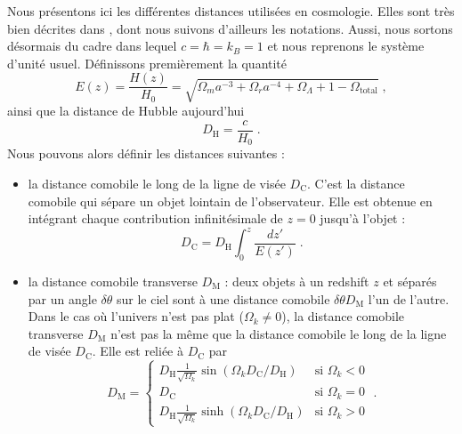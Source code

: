 Nous présentons ici les différentes distances utilisées en cosmologie. Elles sont très bien décrites dans \textcite{Hogg1999}, dont nous suivons d'ailleurs les notations. Aussi, nous sortons désormais du cadre dans lequel $c = \hbar = k_{B} = 1$ et nous reprenons le système d'unité usuel. Définissons premièrement la quantité
\begin{equation}
  \label{eq:dist_ez}
  E(z) = \frac{H(z)}{H_0} 
  = \sqrt{\Omega_m a^{-3} + \Omega_r a^{-4} + \Omega_{\Lambda} + 1 - \Omega_{\mathrm{total}}}  \; ,
\end{equation}
ainsi que la distance de Hubble aujourd'hui
\begin{equation}
  \label{eq:dist_hubble}
  D_{\mathrm{H}} = \frac{c}{H_0}  \; .
\end{equation}
Nous pouvons alors définir les distances suivantes :
\begin{itemize}[label=$\bullet$]
\item la distance comobile le long de la ligne de visée $D_{\mathrm{C}}$. C'est la distance comobile qui sépare un objet lointain de l'observateur. Elle est obtenue en intégrant chaque contribution infinitésimale de $z=0$ jusqu'à l'objet :
  \begin{equation}
    \label{eq:dist_como}
    D_{\mathrm{C}} = D_{\mathrm{H}} \int_0^z \frac{dz'}{E(z')}  \; .
  \end{equation}
\item la distance comobile transverse $D_{\mathrm{M}}$ : deux objets à un redshift $z$ et séparés par un angle $\delta \theta$ sur le ciel sont à une distance comobile $\delta \theta D_{\mathrm{M}}$ l'un de l'autre.
  Dans le cas où l'univers n'est pas plat ($\Omega_k \neq 0$), la distance comobile transverse $D_{\mathrm{M}}$  n'est pas la même que la distance comobile le long de la ligne de visée $D_{\mathrm{C}}$. Elle est reliée à $D_{\mathrm{C}}$ par
  \begin{equation}
    \label{eq:dist_como_trans}
    D_{\mathrm{M}} = \left\{
      \begin{array}{ll}
        D_{\mathrm{H}} \frac{1}{\sqrt{\Omega_k}} \sin(\Omega_k D_{\mathrm{C}} / D_{\mathrm{H}}) & \mbox{si } \Omega_k < 0 \\
        D_{\mathrm{C}} & \textrm{si } \Omega_k = 0 \\
        D_{\mathrm{H}} \frac{1}{\sqrt{\Omega_k}} \sinh(\Omega_k D_{\mathrm{C}} / D_{\mathrm{H}}) & \mbox{si } \Omega_k > 0
      \end{array}
    \right. \; .
  \end{equation}
 

\end{itemize}
